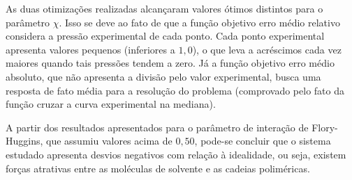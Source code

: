 As duas otimizações realizadas alcançaram valores ótimos distintos para o
parâmetro $\chi$. Isso se deve ao fato de que a função objetivo erro médio
relativo considera a pressão experimental de cada ponto. Cada ponto
experimental apresenta valores pequenos (inferiores a $1,0$), o que leva a
acréscimos cada vez maiores quando tais pressões tendem a zero. Já a função
objetivo erro médio absoluto, que não apresenta a divisão pelo valor
experimental, busca uma resposta de fato média para a resolução do problema
(comprovado pelo fato da função cruzar a curva experimental na
mediana).

A partir dos resultados apresentados para o parâmetro de interação de
Flory-Huggins, que assumiu valores acima de $0,50$, pode-se concluir que o
sistema estudado apresenta desvios negativos com relação à idealidade, ou seja,
existem forças atrativas entre as moléculas de solvente e as cadeias poliméricas.

 

